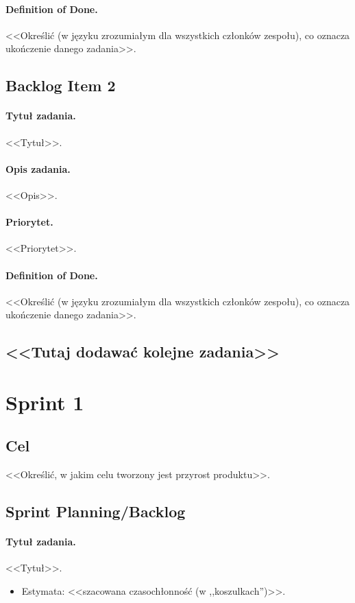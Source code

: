 \documentclass[a4paper]{article}
\begin{document}
\paragraph{Definition of Done.} <<Określić (w języku zrozumiałym dla wszystkich członków zespołu), co oznacza ukończenie danego zadania>>.

\subsection{Backlog Item 2}
\paragraph{Tytuł zadania.} <<Tytuł>>.
\paragraph{Opis zadania.} <<Opis>>.
\paragraph{Priorytet.} <<Priorytet>>.
\paragraph{Definition of Done.} <<Określić (w języku zrozumiałym dla wszystkich członków zespołu), co oznacza ukończenie danego zadania>>.

\subsection*{<<Tutaj dodawać kolejne zadania>>}

\section{Sprint 1}
\subsection{Cel} <<Określić, w jakim celu tworzony jest przyrost produktu>>.
\subsection{Sprint Planning/Backlog}

\paragraph{Tytuł zadania.} <<Tytuł>>.
\begin{itemize}
\item Estymata: <<szacowana czasochłonność (w ,,koszulkach'')>>.
\end{itemize}
\end{document}
